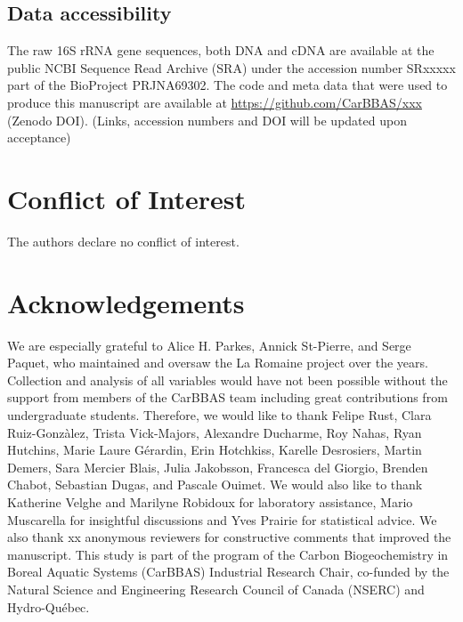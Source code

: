 \documentclass[12pt,a4paper]{article} %
\begin{document}
\subsection*{Data accessibility}
The raw 16S rRNA gene sequences, both DNA and cDNA are available at the public NCBI Sequence Read Archive (SRA) under the accession number SRxxxxx part of the BioProject PRJNA69302. The code and meta data that were used to produce this manuscript are available at \url{https://github.com/CarBBAS/xxx} (Zenodo DOI). (Links, accession numbers and DOI will be updated upon acceptance) \\

\section*{Conflict of Interest}
The authors declare no conflict of interest.

\section*{Acknowledgements}
We are especially grateful to Alice H. Parkes, Annick St-Pierre, and Serge Paquet, who maintained and oversaw the La Romaine project over the years. Collection and analysis of all variables would have not been possible without the support from members of the CarBBAS team including great contributions from undergraduate students. Therefore, we would like to thank Felipe Rust, Clara Ruiz-Gonz\`{a}lez, Trista Vick-Majors, Alexandre Ducharme, Roy Nahas, Ryan Hutchins, Marie Laure G\'{e}rardin,  Erin Hotchkiss, Karelle Desrosiers, Martin Demers, Sara Mercier Blais, Julia Jakobsson, Francesca del Giorgio, Brenden Chabot, Sebastian Dugas, and Pascale Ouimet. We would also like to thank Katherine Velghe and Marilyne Robidoux for laboratory assistance, Mario Muscarella for insightful discussions and Yves Prairie for statistical advice. We also thank xx anonymous reviewers for constructive comments that improved the manuscript. This study is part of the program of the Carbon Biogeochemistry in Boreal Aquatic Systems (CarBBAS) Industrial Research Chair, co-funded by the Natural Science and Engineering Research Council of Canada (NSERC) and Hydro-Qu\'{e}bec.

\newpage
\singlespacing



\newpage
\end{document}
